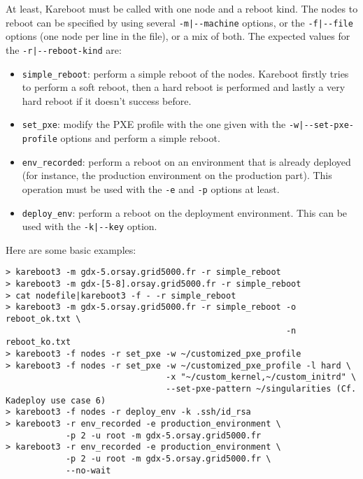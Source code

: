 \documentclass[a4wide,10pt,oneside]{book}
\begin{document}
At least, Kareboot must be called with one node and a reboot kind. The nodes to reboot can be specified by using several \texttt{-m|-{}-machine} options, or the \texttt{-f|-{}-file} options (one node per line in the file), or a mix of both. The expected values for the \texttt{-r|-{}-reboot-kind} are:
\begin{itemize}
\item \texttt{simple\_reboot}: perform a simple reboot of the nodes. Kareboot firstly tries to perform a soft reboot, then a hard reboot is performed and lastly a very hard reboot if it doesn't success before.
\item \texttt{set\_pxe}: modify the PXE profile with the one given with the \texttt{-w|-{}-set-pxe-profile} options and perform a simple reboot.
\item \texttt{env\_recorded}: perform a reboot on an environment that is already deployed (for instance, the production environment on the production part). This operation must be used with the \texttt{-e} and \texttt{-p} options at least.
\item \texttt{deploy\_env}: perform a reboot on the deployment environment. This can be used with the \texttt{-k|-{}-key} option.
\end{itemize}

Here are some basic examples:
\begin{verbatim}
> kareboot3 -m gdx-5.orsay.grid5000.fr -r simple_reboot
> kareboot3 -m gdx-[5-8].orsay.grid5000.fr -r simple_reboot
> cat nodefile|kareboot3 -f - -r simple_reboot
> kareboot3 -m gdx-5.orsay.grid5000.fr -r simple_reboot -o reboot_ok.txt \
                                                        -n reboot_ko.txt
> kareboot3 -f nodes -r set_pxe -w ~/customized_pxe_profile
> kareboot3 -f nodes -r set_pxe -w ~/customized_pxe_profile -l hard \
                                -x "~/custom_kernel,~/custom_initrd" \
                                --set-pxe-pattern ~/singularities (Cf. Kadeploy use case 6)
> kareboot3 -f nodes -r deploy_env -k .ssh/id_rsa
> kareboot3 -r env_recorded -e production_environment \
            -p 2 -u root -m gdx-5.orsay.grid5000.fr
> kareboot3 -r env_recorded -e production_environment \
            -p 2 -u root -m gdx-5.orsay.grid5000.fr \
            --no-wait
\end{verbatim}
\end{document}
